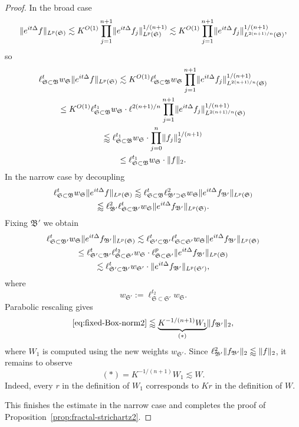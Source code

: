 \documentclass[biblatex]{pzorin-note}
\newcommand{\eit}{e^{i t \Delta}}
\newcommand{\bB}{\mathfrak{B}} %
\newcommand{\bS}{\mathfrak{S}} %
\newcommand{\bBp}{\mathfrak{B}'} %
\newcommand{\bSp}{\mathfrak{S}'} %
\begin{document}
\begin{proof}
In the broad case
\[
\norm{ \eit f }_{L^{p}(\bS)}
\lesssim
K^{O(1)} \prod_{j=1}^{n+1} \norm{ \eit f_{j} }_{L^{p}(\bS)}^{1/(n+1)}
\lesssim
K^{O(1)} \prod_{j=1}^{n+1} \norm{ \eit f_{j} }_{L^{2(n+1)/n}(\bS)}^{1/(n+1)},
\]
so
\begin{multline*}
\ell^{t}_{\bS \subset \bB} w_{\bS} \norm{ \eit f }_{L^{p}(\bS)}
\lesssim
K^{O(1)} \ell^{t}_{\bS \subset \bB} w_{\bS} \prod_{j=1}^{n+1} \norm{ \eit f_{j} }_{L^{2(n+1)/n}(\bS)}^{1/(n+1)}\\
\leq
K^{O(1)} \ell^{t_{1}}_{\bS \subset \bB} w_{\bS} \cdot \ell^{2(n+1)/n} \prod_{j=1}^{n+1} \norm{ \eit f_{j} }_{L^{2(n+1)/n}(\bS)}^{1/(n+1)}\\
\lessapprox
\ell^{t_{1}}_{\bS \subset \bB} w_{\bS} \cdot \prod_{j=0}^{n} \norm{f_{j}}_{2}^{1/(n+1)}\\
\leq
\ell^{t_{1}}_{\bS \subset \bB} w_{\bS} \cdot \norm{f}_{2}.
\end{multline*}
In the narrow case by decoupling
\begin{multline}
\ell^{t}_{\bS \subset \bB} w_{\bS} \norm{ \eit f }_{L^{p}(\bS)}
\lessapprox
\ell^{t}_{\bS \subset \bB} \ell^{2}_{\bBp \supset \bS} w_{\bS} \norm{ \eit f_{\bBp} }_{L^{p}(\bS)}\\
\lessapprox
\ell^{2}_{\bBp} \ell^{t}_{\bS \subset \bBp} w_{\bS} \norm{ \eit f_{\bBp} }_{L^{p}(\bS)}.
\end{multline}
Fixing $\bBp$ we obtain
\begin{multline} \label{eq:fixed-Box-norm2}
\ell^{t}_{\bS \subset \bBp} w_{\bS} \norm{ \eit f_{\bBp} }_{L^{p}(\bS)}
\lesssim
\ell^{t}_{\bSp \subset \bBp} \ell^{t}_{\bS \subset \bSp} w_{\bS} \norm{ \eit f_{\bBp} }_{L^{p}(\bS)}\\
\leq
\ell^{t}_{\bSp \subset \bBp} \ell^{t_{2}}_{\bS \subset \bSp} w_{\bS} \cdot \ell^{p}_{\bS \subset \bSp} \norm{ \eit f_{\bBp} }_{L^{p}(\bS)}\\
\lesssim
\ell^{t}_{\bSp \subset \bBp} w_{\bSp} \cdot \norm{ \eit f_{\bBp} }_{L^{p}(\bSp)},
\end{multline}
where
\[
w_{\bSp} := \ell^{t_{2}}_{\bS \subset \bSp} w_{\bS}.
\]
Parabolic rescaling gives
\[
\eqref{eq:fixed-Box-norm2}
\lessapprox
\underbrace{K^{-1/(n+1)} W_{1}}_{(*)}
\norm{f_{\bBp}}_{2},
\]
where $W_{1}$ is computed using the new weights $w_{\bSp}$.
Since $\ell^{2}_{\bBp} \norm{f_{\bBp}}_{2} \lessapprox \norm{f}_{2}$, it remains to observe
\begin{equation}
\label{eq:big-const2}
(*)
=
K^{-1/(n+1)} W_{1}
\lesssim
W.
\end{equation}
Indeed, every $r$ in the definition of $W_{1}$ corresponds to $Kr$ in the definition of $W$.

This finishes the estimate in the narrow case and completes the proof of Proposition~\ref{prop:fractal-strichartz2}.
\end{proof}
\end{document}
